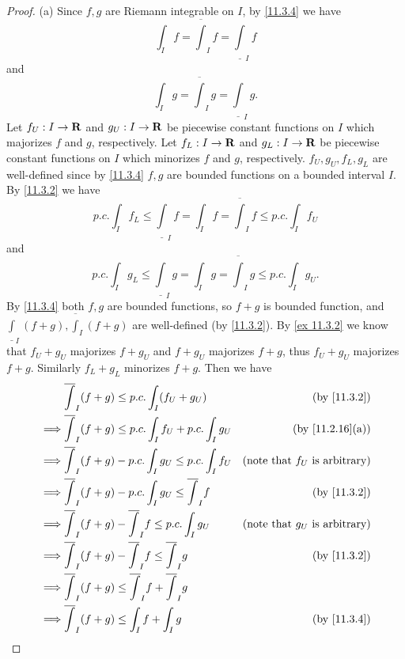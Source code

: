 \begin{proof}{(a)}
  Since \(f, g\) are Riemann integrable on \(I\), by \cref{11.3.4} we have
  \[
    \int_I f = \overline{\int}_I f = \underline{\int}_I f
  \]
  and
  \[
    \int_I g = \overline{\int}_I g = \underline{\int}_I g.
  \]
  Let \(f_U : I \to \mathbf{R}\) and \(g_U : I \to \mathbf{R}\) be piecewise constant functions on \(I\) which majorizes \(f\) and \(g\), respectively.
  Let \(f_L : I \to \mathbf{R}\) and \(g_L : I \to \mathbf{R}\) be piecewise constant functions on \(I\) which minorizes \(f\) and \(g\), respectively.
  \(f_U, g_U, f_L, g_L\) are well-defined since by \cref{11.3.4} \(f, g\) are bounded functions on a bounded interval \(I\).
  By \cref{11.3.2} we have
  \[
    p.c. \int_I f_L \leq \underline{\int}_I f = \int_I f = \overline{\int}_I f \leq p.c. \int_I f_U
  \]
  and
  \[
    p.c. \int_I g_L \leq \underline{\int}_I g = \int_I g = \overline{\int}_I g \leq p.c. \int_I g_U.
  \]
  By \cref{11.3.4} both \(f, g\) are bounded functions, so \(f + g\) is bounded function, and \(\underline{\int}_I (f + g), \overline{\int}_I (f + g)\) are well-defined (by \cref{11.3.2}).
  By \cref{ex 11.3.2} we know that \(f_U + g_U\) majorizes \(f + g_U\) and \(f + g_U\) majorizes \(f + g\), thus \(f_U + g_U\) majorizes \(f + g\).
  Similarly \(f_L + g_L\) minorizes \(f + g\).
  Then we have
  \begin{align*}
             & \overline{\int}_I (f + g) \leq p.c. \int_I (f_U + g_U)                   & \text{(by \cref{11.3.2})}               \\
    \implies & \overline{\int}_I (f + g) \leq p.c. \int_I f_U + p.c. \int_I g_U         & \text{(by \cref{11.2.16}(a))}           \\
    \implies & \overline{\int}_I (f + g) - p.c. \int_I g_U \leq p.c. \int_I f_U         & \text{(note that \(f_U\) is arbitrary)} \\
    \implies & \overline{\int}_I (f + g) - p.c. \int_I g_U \leq \overline{\int}_I f     & \text{(by \cref{11.3.2})}               \\
    \implies & \overline{\int}_I (f + g) - \overline{\int}_I f \leq p.c. \int_I g_U     & \text{(note that \(g_U\) is arbitrary)} \\
    \implies & \overline{\int}_I (f + g) - \overline{\int}_I f \leq \overline{\int}_I g & \text{(by \cref{11.3.2})}               \\
    \implies & \overline{\int}_I (f + g) \leq \overline{\int}_I f + \overline{\int}_I g &                                         \\
    \implies & \overline{\int}_I (f + g) \leq \int_I f + \int_I g                       & \text{(by \cref{11.3.4})}

\end{align*}
\end{proof}
